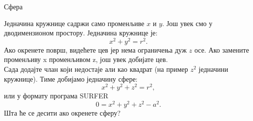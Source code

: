 \documentclass[sr]{./../../common/SurferDesc}%
\begin{document}
\footnotesize
%
\begin{surferPage}
  \begin{surferTitle}Сфера\end{surferTitle}
   \begin{surferText}
   
Једначина кружнице садржи само променљиве $x$ и $y$. Још увек смо у дводимензионом простору.
Једначина кружнице је:
\[x^2+y^2=r^2.\]
Ако окренете површ, видећете цев јер нема ограничења дуж $z$ осе. Ако замените променљиву x променљивом  z, још увек добијате цев.\\
Сада додајте члан који недостаје али као квадрат (на пример $z^2$ једначини кружнице). 
Тиме добијамо једначину сфере:
\[x^2+y^2+z^2=r^2,\]
или у формату програма SURFER
\[0=x^2+y^2+z^2-a^2.\]
Шта ће се десити ако окренете сферу?

     \end{surferText}
\end{surferPage}
\end{document}
